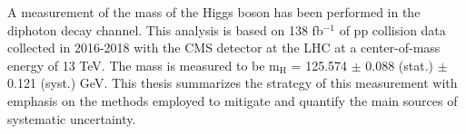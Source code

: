 A measurement of the mass of the Higgs boson has been performed in the diphoton decay channel. This analysis is based on 138 fb$^{-1}$ of pp collision data collected in 2016-2018 with the CMS detector at the LHC at a center-of-mass energy of 13 TeV. The mass is measured to be m$_{\mathrm{H}}$ = 125.574 $\pm$ 0.088 (stat.) $\pm$ 0.121 (syst.) GeV. This thesis summarizes the strategy of this measurement with emphasis on the methods employed to mitigate and quantify the main sources of systematic uncertainty.
